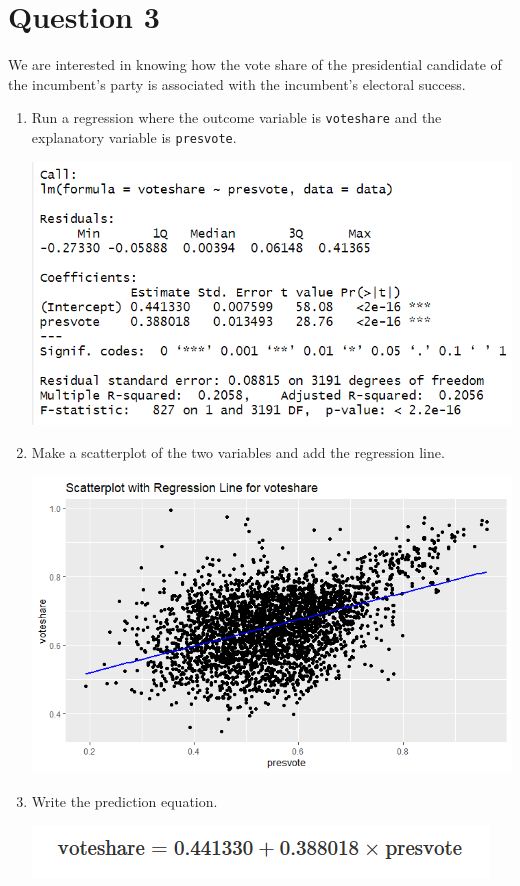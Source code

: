 \documentclass[12pt,letterpaper]{article}
\begin{document}
	\newpage	
\section*{Question 3}

\noindent We are interested in knowing how the vote share of the presidential candidate of the incumbent's party is associated with the incumbent's electoral success.
	\vspace{.25cm}
	\begin{enumerate}
		\item Run a regression where the outcome variable is \texttt{voteshare} and the explanatory variable is \texttt{presvote}.
	     
	    \includegraphics[width=0.8\linewidth]{Q9}
		\item Make a scatterplot of the two variables and add the regression line. 
	     
        \includegraphics[width=0.9\linewidth]{Q10}
		\item Write the prediction equation.
		 
		\includegraphics[width=0.9\linewidth]{Q11}
	\end{enumerate}
	
\end{document}

